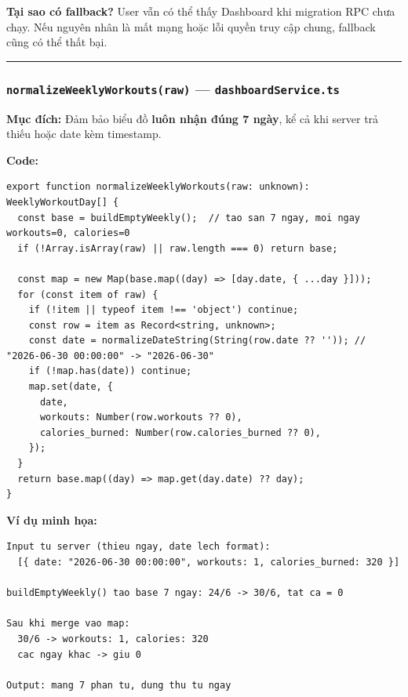 \documentclass[12pt,a4paper]{article}
\begin{document}
\textbf{Tại sao có fallback?} User vẫn có thể thấy Dashboard khi
migration RPC chưa chạy. Nếu nguyên nhân là mất mạng hoặc lỗi quyền truy
cập chung, fallback cũng có thể thất bại.

\begin{center}\rule{0.5\linewidth}{0.5pt}\end{center}

\subsubsection{\texorpdfstring{\texttt{normalizeWeeklyWorkouts(raw)} ---
\texttt{dashboardService.ts}}{normalizeWeeklyWorkouts(raw) --- dashboardService.ts}}\label{normalizeweeklyworkoutsraw-dashboardservice.ts}

\textbf{Mục đích:} Đảm bảo biểu đồ \textbf{luôn nhận đúng 7 ngày}, kể cả
khi server trả thiếu hoặc date kèm timestamp.

\textbf{Code:}

\begin{verbatim}
export function normalizeWeeklyWorkouts(raw: unknown): WeeklyWorkoutDay[] {
  const base = buildEmptyWeekly();  // tao san 7 ngay, moi ngay workouts=0, calories=0
  if (!Array.isArray(raw) || raw.length === 0) return base;

  const map = new Map(base.map((day) => [day.date, { ...day }]));
  for (const item of raw) {
    if (!item || typeof item !== 'object') continue;
    const row = item as Record<string, unknown>;
    const date = normalizeDateString(String(row.date ?? '')); // "2026-06-30 00:00:00" -> "2026-06-30"
    if (!map.has(date)) continue;
    map.set(date, {
      date,
      workouts: Number(row.workouts ?? 0),
      calories_burned: Number(row.calories_burned ?? 0),
    });
  }
  return base.map((day) => map.get(day.date) ?? day);
}

\end{verbatim}

\textbf{Ví dụ minh họa:}

\begin{verbatim}
Input tu server (thieu ngay, date lech format):
  [{ date: "2026-06-30 00:00:00", workouts: 1, calories_burned: 320 }]

buildEmptyWeekly() tao base 7 ngay: 24/6 -> 30/6, tat ca = 0

Sau khi merge vao map:
  30/6 -> workouts: 1, calories: 320
  cac ngay khac -> giu 0

Output: mang 7 phan tu, dung thu tu ngay
\end{verbatim}
\end{document}

